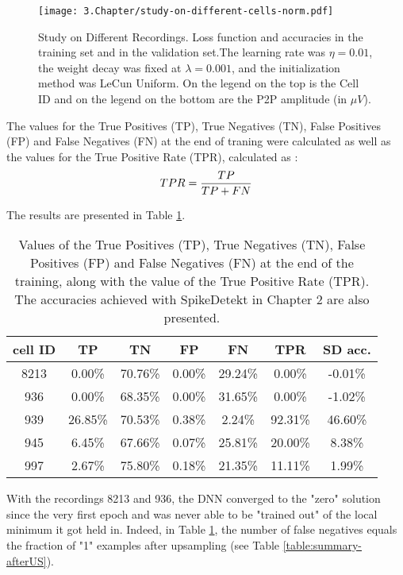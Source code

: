 \begin{figure}[htb]
	\centering
	\texttt{[image: 3.Chapter/study-on-different-cells-norm.pdf]}
	\caption{Study on Different Recordings. Loss function and accuracies in the training set and in the validation set.The learning rate was $\eta = 0.01$, the weight decay was fixed at $\lambda = 0.001$, and the initialization method was LeCun Uniform. On the legend on the top is the Cell ID and on the legend on the bottom are the P2P amplitude (in $\mu V$).
}
\label{fig:study-cells}
\end{figure}

The values for the True Positives (TP), True Negatives (TN), False Positives (FP) and False Negatives (FN) at the end of traning were calculated as well as the values for the True Positive Rate (TPR), calculated as :
\begin{equation}
\centering
TPR = \frac{TP}{TP + FN}
\end{equation}

The results are presented in Table \ref{table:confusion-matrix}.

\begin{table}[htb]
\begin{center}
\begin{tabular}{c|cccc|cc}
cell ID & TP & TN & FP & FN & TPR & SD acc.\\ \hline
8213 & 0.00\% & 70.76\% & 0.00\% & 29.24\% & 0.00\% & -0.01\% \\
936 & 0.00\% & 68.35\% & 0.00\% & 31.65\% & 0.00\% & -1.02\% \\ 
939 & 26.85\% & 70.53\% & 0.38\% & 2.24\% & 92.31\% & 46.60\% \\ 
945 & 6.45\% & 67.66\% & 0.07\% & 25.81\% & 20.00\% & 8.38\% \\ 
997 & 2.67\% & 75.80\% & 0.18\% & 21.35\% & 11.11\% & 1.99\% \\ 
\end{tabular}
\end{center}
\caption{Values of the True Positives (TP), True Negatives (TN), False Positives (FP) and False Negatives (FN) at the end of the training, along with the value of the True Positive Rate (TPR). The accuracies achieved with SpikeDetekt in Chapter 2 are also presented. }
\label{table:confusion-matrix}
\end{table}

With the recordings 8213 and 936, the DNN converged to the "zero" solution since the very first epoch and was never able to be "trained out" of the local minimum it got held in. Indeed, in Table \ref{table:confusion-matrix}, the number of false negatives equals the fraction of "1" examples after upsampling (see Table \ref{table:summary-afterUS}).

